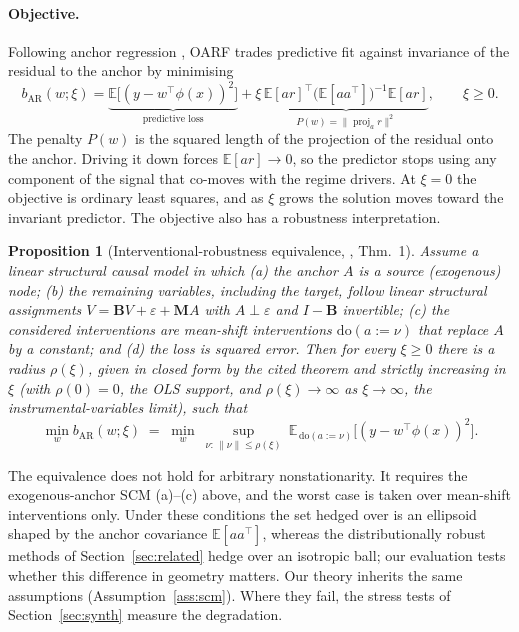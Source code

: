 \documentclass[12pt]{article}
\theoremstyle{plain}
\newtheorem{proposition}{Proposition}
\theoremstyle{remark}
\newcommand{\E}{\mathbb{E}}
\newcommand{\doop}{\mathrm{do}}
\newcommand{\OARF}{\textsc{OARF}}
\DeclareMathOperator{\proj}{proj}
\begin{document}
\paragraph{Objective.}
Following anchor regression \citep{rothenhausler2021anchor}, \OARF{} trades
predictive fit against invariance of the residual to the anchor by minimising
\begin{equation}\label{eq:bar}
b_{\mathrm{AR}}(w;\xi) = \underbrace{\E\!\big[(y-w^\top\phi(x))^2\big]}_{\text{predictive loss}}
 + \xi\,\underbrace{\E[a r]^\top\big(\E[aa^\top]\big)^{-1}\E[a r]}_{P(w)=\|\proj_a r\|^2},
 \qquad \xi\ge 0 .
\end{equation}
The penalty $P(w)$ is the squared length of the projection of the residual onto the
anchor. Driving it down forces $\E[a r]\to 0$, so the predictor stops using any
component of the signal that co-moves with the regime drivers. At $\xi=0$ the
objective is ordinary least squares, and as $\xi$ grows the solution moves toward the
invariant predictor. The objective also has a robustness interpretation.

\begin{proposition}[Interventional-robustness equivalence,
\citealp{rothenhausler2021anchor}, Thm.~1]\label{prop:equiv}
Assume a linear structural causal model in which (a) the anchor $A$ is a
\emph{source} (exogenous) node; (b) the remaining variables, including the target,
follow linear structural assignments $V=\mathbf{B}V+\varepsilon+\mathbf{M}A$ with
$A\perp\varepsilon$ and $I-\mathbf{B}$ invertible; (c) the considered interventions
are mean-shift interventions $\doop(a:=\nu)$ that replace $A$ by a constant; and (d)
the loss is squared error. Then for every $\xi\ge 0$ there is a radius
$\rho(\xi)$, given in closed form by the cited theorem and strictly increasing in
$\xi$ (with $\rho(0)=0$, the OLS support, and $\rho(\xi)\!\to\!\infty$ as
$\xi\!\to\!\infty$, the instrumental-variables limit), such that
\begin{equation}\label{eq:equiv}
\min_w b_{\mathrm{AR}}(w;\xi) \;=\; \min_w\ \sup_{\nu:\,\|\nu\|\le\rho(\xi)}\
 \E_{\,\doop(a:=\nu)}\!\big[(y-w^\top\phi(x))^2\big].
\end{equation}
\end{proposition}
\noindent The equivalence does not hold for arbitrary nonstationarity. It requires the
exogenous-anchor SCM (a)--(c) above, and the worst case is taken over mean-shift
interventions only. Under these conditions the set hedged over is an ellipsoid shaped
by the anchor covariance $\E[aa^\top]$, whereas the distributionally robust methods of
Section~\ref{sec:related} hedge over an isotropic ball; our evaluation tests whether
this difference in geometry matters. Our theory inherits the same assumptions
(Assumption~\ref{ass:scm}). Where they fail, the stress tests of
Section~\ref{sec:synth} measure the degradation.
\end{document}
